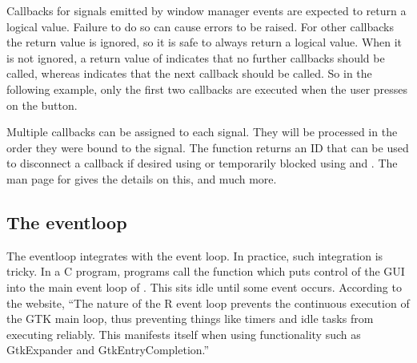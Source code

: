 Callbacks for signals emitted by window manager events are expected to
return a logical value. Failure to do so can cause errors to be
raised. For other callbacks the return value is ignored, so it is safe to
always return a logical value. When it is not ignored, a return value
of  indicates that no further callbacks should be called,
whereas  indicates that the next callback should be
called. So in the following example, only the first two callbacks are
executed when the user presses on the button.

\begin{Schunk}
\end{Schunk}

Multiple callbacks can be assigned to each signal. They will be
processed in the order they were bound to the signal.  The
 function returns an ID that can be used to
disconnect a callback if desired using
 or temporarily blocked using
 and
. The man page for
 gives the details on this, and much more.



\subsection{The eventloop}


The  eventloop integrates with the \R\/ event loop. In practice, such
integration is tricky. In a C program, \GTK\/ programs call the
function  which puts control of the GUI into the main
event loop of \GTK. This sits idle until some event occurs. According
to the  website, ``The nature of the R event loop prevents
the continuous execution of the GTK main loop, thus preventing things
like timers and idle tasks from executing reliably. This manifests
itself when using functionality such as GtkExpander and
GtkEntryCompletion.''

